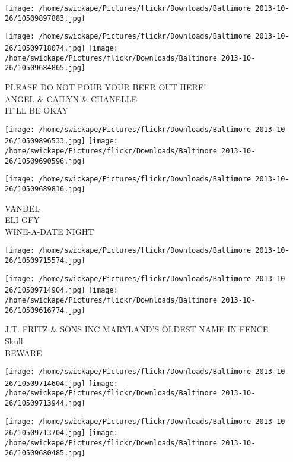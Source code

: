 \documentclass[10pt,letterpaper]{article}
\begin{document}
\texttt{[image: /home/swickape/Pictures/flickr/Downloads/Baltimore 2013-10-26/10509897883.jpg]}

\vspace{0.25in}
\texttt{[image: /home/swickape/Pictures/flickr/Downloads/Baltimore 2013-10-26/10509718074.jpg]}
\texttt{[image: /home/swickape/Pictures/flickr/Downloads/Baltimore 2013-10-26/10509684865.jpg]}

PLEASE DO NOT POUR YOUR BEER OUT HERE!\\
ANGEL \& CAILYN \& CHANELLE\\
IT'LL BE OKAY\\
\pagebreak

\texttt{[image: /home/swickape/Pictures/flickr/Downloads/Baltimore 2013-10-26/10509896533.jpg]}
\texttt{[image: /home/swickape/Pictures/flickr/Downloads/Baltimore 2013-10-26/10509690596.jpg]}

\vspace{0.25in}
\texttt{[image: /home/swickape/Pictures/flickr/Downloads/Baltimore 2013-10-26/10509689816.jpg]}

VANDEL\\
ELI GFY\\
WINE{-}A{-}DATE NIGHT\\
\pagebreak

\texttt{[image: /home/swickape/Pictures/flickr/Downloads/Baltimore 2013-10-26/10509715574.jpg]}

\vspace{0.25in}
\texttt{[image: /home/swickape/Pictures/flickr/Downloads/Baltimore 2013-10-26/10509714904.jpg]}
\texttt{[image: /home/swickape/Pictures/flickr/Downloads/Baltimore 2013-10-26/10509616774.jpg]}

J.T. FRITZ \& SONS INC MARYLAND'S OLDEST NAME IN FENCE\\
Skull\\
BEWARE\\
\pagebreak

\texttt{[image: /home/swickape/Pictures/flickr/Downloads/Baltimore 2013-10-26/10509714604.jpg]}
\texttt{[image: /home/swickape/Pictures/flickr/Downloads/Baltimore 2013-10-26/10509713944.jpg]}

\texttt{[image: /home/swickape/Pictures/flickr/Downloads/Baltimore 2013-10-26/10509713704.jpg]}
\texttt{[image: /home/swickape/Pictures/flickr/Downloads/Baltimore 2013-10-26/10509680485.jpg]}
\end{document}
